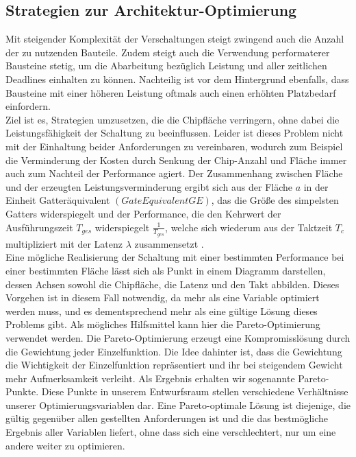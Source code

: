 \documentclass[conference]{IEEEtran}
\begin{document}
\subsection{Strategien zur Architektur-Optimierung}
Mit steigender Komplexität der Verschaltungen steigt zwingend auch die Anzahl der  zu nutzenden Bauteile. Zudem steigt auch die Verwendung performaterer Bausteine stetig, um die Abarbeitung bezüglich Leistung und aller zeitlichen Deadlines einhalten zu können. Nachteilig ist vor dem Hintergrund ebenfalls, dass Bausteine mit einer höheren Leistung oftmals auch einen erhöhten Platzbedarf einfordern\cite[S.327]{2}.\\
Ziel ist es, Strategien umzusetzen, die die Chipfläche verringern, ohne dabei die Leistungsfähigkeit der Schaltung zu beeinflussen. Leider ist dieses Problem nicht mit der Einhaltung beider Anforderungen zu vereinbaren, wodurch zum Beispiel die Verminderung der Kosten durch Senkung der Chip-Anzahl und Fläche immer auch zum Nachteil der Performance agiert. Der Zusammenhang zwischen Fläche und der erzeugten Leistungsverminderung ergibt sich aus der Fläche $a$ in der Einheit Gatteräquivalent $(Gate Equivalent GE)$, das die Größe des simpelsten Gatters widerspiegelt\cite[S.326]{2} und der Performance, die den Kehrwert der Ausführungszeit $T_{ges}$ widerspiegelt $\frac{1}{T_{ges}}$, welche sich wiederum aus der Taktzeit $T_c$ multipliziert mit der Latenz $\lambda$ zusammensetzt
\cite[S.325-326]{2}.\\
 Eine mögliche Realisierung der Schaltung mit einer bestimmten Performance bei einer bestimmten Fläche lässt sich als Punkt in einem Diagramm darstellen, dessen Achsen sowohl die Chipfläche, die Latenz und den Takt abbilden\cite[S.326]{2}.
 Dieses Vorgehen\cite{?} ist in diesem Fall notwendig, da mehr als eine Variable optimiert werden muss, und es dementsprechend mehr als eine gültige Lösung dieses Problems gibt. Als mögliches Hilfsmittel kann hier die Pareto-Optimierung verwendet werden. Die Pareto-Optimierung erzeugt eine Kompromisslösung durch die Gewichtung jeder Einzelfunktion. Die Idee dahinter ist, dass die Gewichtung die Wichtigkeit der Einzelfunktion repräsentiert und ihr bei steigendem Gewicht mehr Aufmerksamkeit verleiht\cite[S.45]{4}. Als Ergebnis erhalten wir sogenannte Pareto-Punkte. Diese Punkte in unserem Entwurfsraum stellen verschiedene Verhältnisse unserer Optimierungsvariablen dar. Eine Pareto-optimale Lösung ist diejenige, die gültig gegenüber allen gestellten Anforderungen ist und die das bestmögliche Ergebnis aller Variablen liefert, ohne dass sich eine verschlechtert, nur um eine andere weiter zu optimieren.
\end{document}
